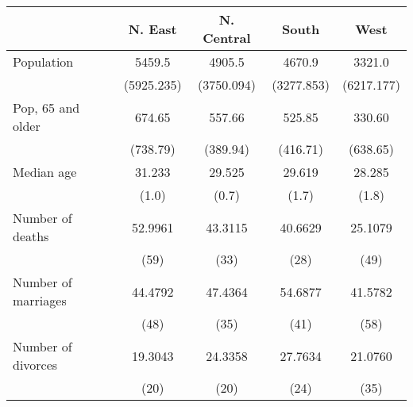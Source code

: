 \begin{tabular}{l*{4}{c}}
\toprule
                &  N. East&N. Central&    South&     West\\
\midrule
Population      &   5459.5&   4905.5&   4670.9&   3321.0\\
                &(5925.235)&(3750.094)&(3277.853)&(6217.177)\\
\addlinespace
Pop, 65 and older&   674.65&   557.66&   525.85&   330.60\\
                & (738.79)& (389.94)& (416.71)& (638.65)\\
\addlinespace
Median age      &   31.233&   29.525&   29.619&   28.285\\
                &    (1.0)&    (0.7)&    (1.7)&    (1.8)\\
\addlinespace
Number of deaths&  52.9961&  43.3115&  40.6629&  25.1079\\
                &     (59)&     (33)&     (28)&     (49)\\
\addlinespace
Number of marriages&  44.4792&  47.4364&  54.6877&  41.5782\\
                &     (48)&     (35)&     (41)&     (58)\\
\addlinespace
Number of divorces&  19.3043&  24.3358&  27.7634&  21.0760\\
                &     (20)&     (20)&     (24)&     (35)\\
\bottomrule
\end{tabular}
